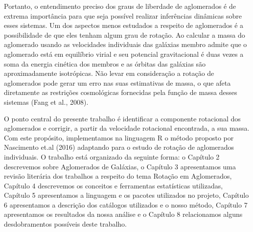 Portanto, o entendimento preciso dos graus de liberdade de aglomerados é de extrema importância para que seja possível realizar inferências dinâmicas sobre esses sistemas. Um dos aspectos menos estudados a respeito de aglomerados é a possibilidade de que eles tenham algum grau de rotação. Ao calcular a massa do aglomerado usando as velocidades individuais das galáxias membro admite que o aglomerado está em equilíbrio virial e seu potencial gravitacional é duas vezes a soma da energia cinética dos membros e as órbitas das galáxias são aproximadamente isotrópicas. Não levar em consideração a rotação de aglomerados pode gerar um erro nas suas estimativas de massa, o que afeta diretamente as restrições cosmológicas fornecidas pela função de massa desses sistemas (Fang et al., 2008).

O ponto central do presente trabalho é identificar a componente rotacional dos aglomerados e corrigir, a partir da velocidade rotacional encontrada, a sua massa. Com este propósito, implementamos na linguagem R o método proposto por Nascimento et.al (2016) adaptando para o estudo de rotação de aglomerados individuais. O trabalho está organizado da seguinte forma: o Capítulo 2 descrevemos sobre Aglomerados de Galáxias, o Capítulo 3 apresentamos uma revisão literária dos trabalhos a respeito do tema Rotação em Aglomerados, Capítulo 4 descrevemos os conceitos e ferramentas estatísticas utilizadas, Capítulo 5 apresentamos a linguagem e os pacotes utilizados no projeto, Capítulo 6 apresentamos a descrição dos catálogos utilizados e o nosso método, Capítulo 7 apresentamos os resultados da nossa análise e o Capítulo 8 relacionamos alguns desdobramentos possíveis deste trabalho.         

